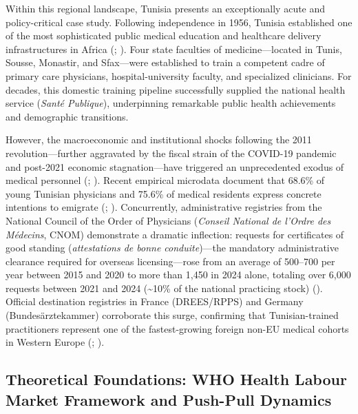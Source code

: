 \documentclass[
  11pt,
  a4paper]{article}
\begin{document}
Within this regional landscape, Tunisia presents an exceptionally acute
and policy-critical case study. Following independence in 1956, Tunisia
established one of the most sophisticated public medical education and
healthcare delivery infrastructures in Africa
(; ). Four state faculties of medicine---located in Tunis, Sousse,
Monastir, and Sfax---were established to train a competent cadre of
primary care physicians, hospital-university faculty, and specialized
clinicians. For decades, this domestic training pipeline successfully
supplied the national health service (\emph{Santé Publique}),
underpinning remarkable public health achievements and demographic
transitions.

However, the macroeconomic and institutional shocks following the 2011
revolution---further aggravated by the fiscal strain of the COVID-19
pandemic and post-2021 economic stagnation---have triggered an
unprecedented exodus of medical personnel
(;
). Recent empirical
microdata document that 68.6\% of young Tunisian physicians and 75.6\%
of medical residents express concrete intentions to emigrate
(;
). Concurrently,
administrative registries from the National Council of the Order of
Physicians (\emph{Conseil National de l'Ordre des Médecins}, CNOM)
demonstrate a dramatic inflection: requests for certificates of good
standing (\emph{attestations de bonne conduite})---the mandatory
administrative clearance required for overseas licensing---rose from an
average of 500--700 per year between 2015 and 2020 to more than 1,450 in
2024 alone, totaling over 6,000 requests between 2021 and 2024
(\textasciitilde10\% of the national practicing stock)
(). Official destination registries in France (DREES/RPPS)
and Germany (Bundesärztekammer) corroborate this surge, confirming that
Tunisian-trained practitioners represent one of the fastest-growing
foreign non-EU medical cohorts in Western Europe
(;
).

\subsection{Theoretical Foundations: WHO Health Labour Market Framework
and Push-Pull Dynamics}\label{sec-intro-framework}
\end{document}
